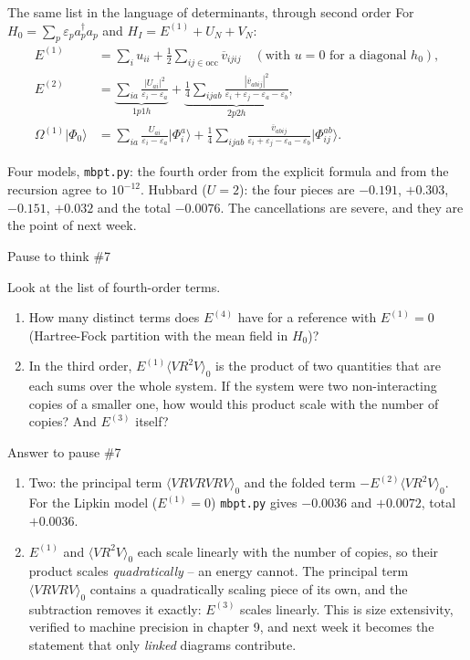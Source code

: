 \documentclass[aspectratio=169,10pt]{beamer}
\newcounter{thinkctr}
\newcommand{\thinkq}[2]{%
  \stepcounter{thinkctr}%
  \vfill
  \begin{tcolorbox}[enhanced,colback=palewarm,colframe=warm,boxrule=1.2pt,arc=4pt,
    grow to left by=6mm,grow to right by=6mm,
    left=16pt,right=16pt,top=16pt,bottom=18pt,
    fonttitle=\bfseries\Large,fontupper=\Large,
    title={Pause to think \#\thethinkctr\hfill\mdseries\normalsize(about #1 min -- discuss with your neighbour)}]
  #2
  \end{tcolorbox}
  \vfill}
\newcommand{\thinka}[1]{%
  \vfill
  \begin{tcolorbox}[enhanced,colback=paleteal,colframe=teal,boxrule=1.2pt,arc=4pt,
    grow to left by=6mm,grow to right by=6mm,
    left=16pt,right=16pt,top=16pt,bottom=18pt,
    fonttitle=\bfseries\Large,fontupper=\large,
    title={Answer to pause \#\thethinkctr}]
  #1
  \end{tcolorbox}
  \vfill}
\newcommand{\numbox}[1]{%
  \begin{tcolorbox}[colback=palegreen,colframe=teal!70!black,title={\bfseries Measured}]
  #1
  \end{tcolorbox}}
\newcommand{\ket}[1]{\vert #1\rangle}
\newcommand{\av}[1]{\langle #1\rangle_0}
\newcommand{\cre}[1]{a_{#1}^{\dagger}}
\newcommand{\ann}[1]{a_{#1}}
\newcommand{\vbar}[4]{\overline v_{#1#2#3#4}}
\newcommand{\ph}{\Phi_0}
\begin{document}
\begin{frame}{The same list in the language of determinants, through second order}
For \(H_0=\sum_p\varepsilon_p\cre{p}\ann{p}\) and \(H_I=E^{(1)}+U_N+V_N\):
\begin{align*}
E^{(1)}&=\sum_{i}u_{ii}+\frac12\sum_{ij\in\mathrm{occ}}\vbar{i}{j}{i}{j}
\quad(\text{with } u=0 \text{ for a diagonal } h_0),\\[2pt]
E^{(2)}&=\underbrace{\sum_{ia}\frac{|U_{ai}|^2}{\varepsilon_i-\varepsilon_a}}_{1p1h}
+\underbrace{\frac14\sum_{ijab}\frac{|\vbar{a}{b}{i}{j}|^2}{\varepsilon_i+\varepsilon_j-\varepsilon_a-\varepsilon_b}}_{2p2h},\\[2pt]
\Omega^{(1)}\ket{\ph}&=\sum_{ia}\frac{U_{ai}}{\varepsilon_i-\varepsilon_a}\ket{\Phi_i^a}
+\frac14\sum_{ijab}\frac{\vbar{a}{b}{i}{j}}{\varepsilon_i+\varepsilon_j-\varepsilon_a-\varepsilon_b}\ket{\Phi_{ij}^{ab}}.
\end{align*}
\numbox{Four models, \texttt{mbpt.py}: the fourth order from the explicit formula and from the recursion agree to \(10^{-12}\). Hubbard (\(U=2\)): the four pieces are \(-0.191\), \(+0.303\), \(-0.151\), \(+0.032\) and the total \(-0.0076\). The cancellations are severe, and they are the point of next week.}
\end{frame}

\begin{frame}{Pause to think \#7}
\thinkq{3}{Look at the list of fourth-order terms.
\begin{enumerate}
\item How many distinct terms does \(E^{(4)}\) have for a reference with \(E^{(1)}=0\) (Hartree-Fock partition with the mean field in \(H_0\))?
\item In the third order, \(E^{(1)}\av{VR^2V}\) is the product of two quantities that are each sums over the whole system. If the system were two non-interacting copies of a smaller one, how would this product scale with the number of copies? And \(E^{(3)}\) itself?
\end{enumerate}}
\end{frame}

\begin{frame}{Answer to pause \#7}
\thinka{%
\begin{enumerate}
\item Two: the principal term \(\av{VRVRVRV}\) and the folded term \(-E^{(2)}\av{VR^2V}\). For the Lipkin model (\(E^{(1)}=0\)) \texttt{mbpt.py} gives \(-0.0036\) and \(+0.0072\), total \(+0.0036\).
\item \(E^{(1)}\) and \(\av{VR^2V}\) each scale linearly with the number of copies, so their product scales \emph{quadratically} -- an energy cannot. The principal term \(\av{VRVRV}\) contains a quadratically scaling piece of its own, and the subtraction removes it exactly: \(E^{(3)}\) scales linearly. This is size extensivity, verified to machine precision in chapter 9, and next week it becomes the statement that only \emph{linked} diagrams contribute.
\end{enumerate}}
\end{frame}
\end{document}
